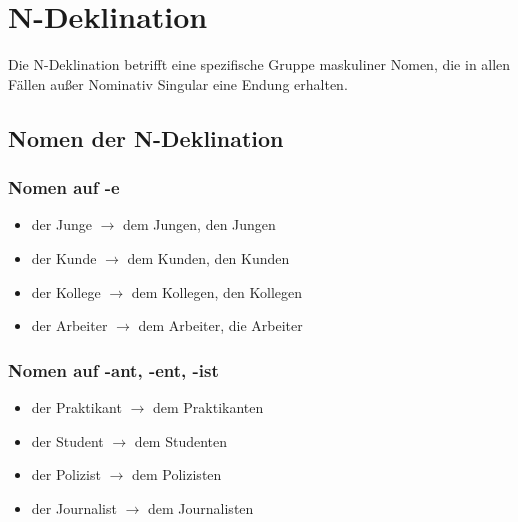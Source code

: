 \chapter{N-Deklination}
\label{cha:NDeklination}

Die N-Deklination betrifft eine spezifische Gruppe maskuliner Nomen, die in allen Fällen außer Nominativ Singular eine Endung erhalten.

\section{Nomen der N-Deklination}
\label{sec:NDeklinationNomen}

\subsection{Nomen auf -e}
\begin{itemize}
    \item der Junge $\rightarrow$ dem Jungen, den Jungen
    \item der Kunde $\rightarrow$ dem Kunden, den Kunden
    \item der Kollege $\rightarrow$ dem Kollegen, den Kollegen
    \item der Arbeiter $\rightarrow$ dem Arbeiter, die Arbeiter
\end{itemize}

\subsection{Nomen auf -ant, -ent, -ist}
\begin{itemize}
    \item der Praktikant $\rightarrow$ dem Praktikanten
    \item der Student $\rightarrow$ dem Studenten
    \item der Polizist $\rightarrow$ dem Polizisten
    \item der Journalist $\rightarrow$ dem Journalisten
\end{itemize}

